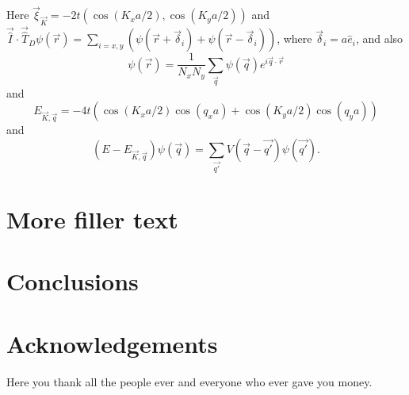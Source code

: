 \documentclass[twoside,british,a4paper]{article}
\begin{document}
\lipsum[1-3]

Here $\vec{\xi }_{\vec{K}}=-2t(\cos(K_x a/2),\cos(K_y a/2))$ and $\vec{\hat{I}}\cdot\vec{\hat{T}}_D\psi(\vec{r})=\sum_{i=x,y}\left(\psi(\vec{r}+\vec{\delta}_i)+\psi(\vec{r}-\vec{\delta}_i)\right)$, where $\vec{\delta}_i=a\hat{e}_{i}$, and also
\begin{equation}
\psi(\vec{r})=\frac{1}{N_x N_y}\sum_{\vec{q}}\psi(\vec{q})e^{i\vec{q}\cdot\vec{r}}
\end{equation}
and
$$
E_{\vec{K},\vec{q}}=-4t\left(\cos(K_xa/2)\cos(q_xa)+\cos(K_ya/2)\cos(q_ya)\right)
$$ 
and 
\begin{equation}
(E-E_{\vec{K},\vec{q}})\psi(\vec{q})=\sum_{\vec{q'}}V(\vec{q}-\vec{q'})\psi(\vec{q'}). 
\end{equation}



\section{More filler text}

\lipsum[1-6]

\section{Conclusions}

\lipsum[11-12]


\section*{Acknowledgements}
Here you thank all the people ever and everyone who ever gave you money.




 
{}
\end{document}
